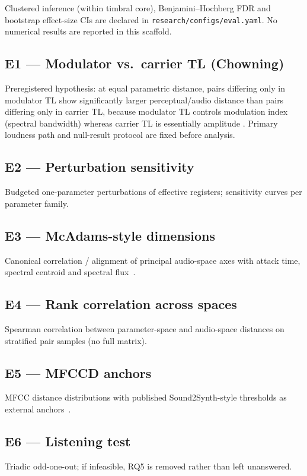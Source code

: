 \documentclass{article}
\begin{document}
Clustered inference (within timbral core), Benjamini--Hochberg FDR and
bootstrap effect-size CIs are declared in
\texttt{research/configs/eval.yaml}.
No numerical results are reported in this scaffold.

\subsection{E1 --- Modulator vs.\ carrier TL (Chowning)}
\label{sec:e1}
Preregistered hypothesis: at equal parametric distance, pairs differing only in
modulator TL show significantly larger perceptual/audio distance than pairs
differing only in carrier TL, because modulator TL controls modulation index
(spectral bandwidth) whereas carrier TL is essentially amplitude
\cite{chowning1973}.
Primary loudness path and null-result protocol are fixed before analysis.

\subsection{E2 --- Perturbation sensitivity}
\label{sec:e2}
Budgeted one-parameter perturbations of effective registers; sensitivity curves
per parameter family.

\subsection{E3 --- McAdams-style dimensions}
\label{sec:e3}
Canonical correlation / alignment of principal audio-space axes with attack
time, spectral centroid and spectral flux~\citep{mcadams1995,peeters2011}.

\subsection{E4 --- Rank correlation across spaces}
\label{sec:e4}
Spearman correlation between parameter-space and audio-space distances on
stratified pair samples (no full matrix).

\subsection{E5 --- MFCCD anchors}
\label{sec:e5}
MFCC distance distributions with published Sound2Synth-style thresholds as
external anchors~\citep{chen2022sound2synth}.

\subsection{E6 --- Listening test}
\label{sec:e6}
Triadic odd-one-out; if infeasible, RQ5 is removed rather than left unanswered.
\end{document}
